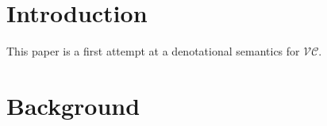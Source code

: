 \documentclass[acmsmall,review,dvipsnames]{acmart}
\newcommand{\versecalc}{$\mathcal{VC}$}
\begin{document}
\maketitle


\section{Introduction}

This paper is a first attempt at a denotational semantics for \versecalc{}.

\section{Background}
\end{document}
